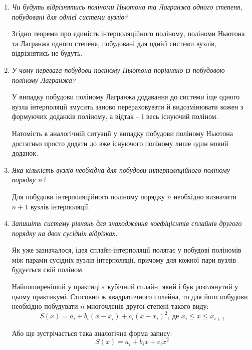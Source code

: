 \documentclass[a4paper,14pt]{extarticle} %
\begin{document}
\begin{enumerate}
    \item \textit{Чи будуть відрізнятись поліноми Ньютона та Лагранжа одного степеня, побудовані для однієї 
    системи вузлів?}

    Згідно теореми про єдиність інтерполяційного поліному, поліноми Ньютона та Лагранжа одного степеня, 
    побудовані для однієї системи вузлів, відрізнятись не будуть.

    \item \textit{У чому перевага побудови поліному Ньютона порівняно із побудовою поліному Лагранжа?}
    
    У випадку побудови поліному Лагранжа додавання до системи іще одного вузла інтерполяції змусить заново 
    перераховувати й видозмінювати кожен з формуючих доданків поліному, а відтак -- і весь існуючий поліном. 
    
    Натомість в аналогічній ситуації у випадку побудови поліному Ньютона достатньо просто додати до вже 
    існуючого поліному лише один новий доданок.
    
    \item \textit{Яка кількість вузлів необхідна для побудови інтерполяційного поліному порядку $n$?}
    
    Для побудови інтерполяційного поліному порядку $n$ необхідно визначити $n+1$ вузлів інтерполяції. 
    
    \item \textit{Запишіть систему рівнянь для знаходження коефіцієнтів сплайнів другого порядку на двох 
    сусідніх відрізках.}

    Як уже зазначалося, ідея сплайн-інтерполяції полягає у побудові поліномів між парами сусідніх вузлів 
    інтерполяції, причому для кожної пари вузлів будується свій поліном. 

    Найпоширеніший у практиці є кубічний сплайн, який і був розглянутий у цьому практикумі. Стосовно ж 
    квадратичного сплайна, то для його побудови необхідно побудувати $n$ многочленів другої степені 
    такого виду:
    \[ S(x)=a_i+b_i(x-x_{i})+c_i(x-x_i)^2,\ \text{де } x_i\leqslant x\leqslant x_{i+1}\]

    Або ще зустрічається така аналогічна форма запису:
    \[ S(x)=a_i+b_i x+c_i x^2 \]


\end{enumerate}
\end{document}
